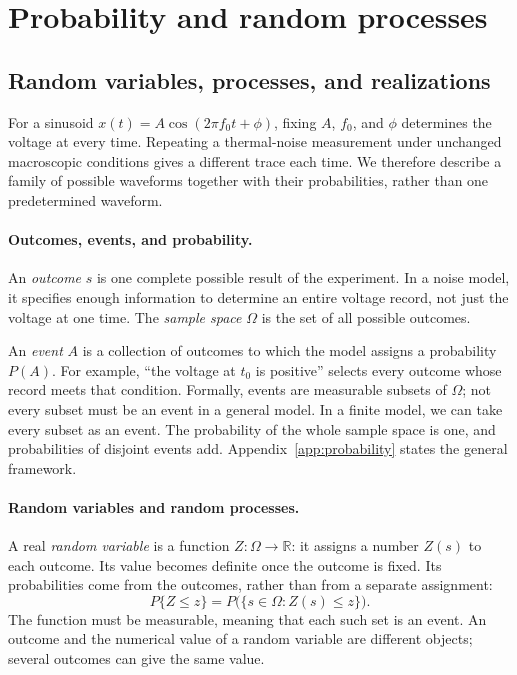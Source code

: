 
\section{Probability and random processes}
\subsection{Random variables, processes, and realizations}
For a sinusoid $x(t)=A\cos(2\pi f_0t+\phi)$, fixing $A$, $f_0$, and $\phi$ determines the voltage at every time. Repeating a thermal-noise measurement under unchanged macroscopic conditions gives a different trace each time. We therefore describe a family of possible waveforms together with their probabilities, rather than one predetermined waveform.

\paragraph{Outcomes, events, and probability.}
An \emph{outcome} $s$ is one complete possible result of the experiment. In a noise model, it specifies enough information to determine an entire voltage record, not just the voltage at one time. The \emph{sample space} $\Omega$ is the set of all possible outcomes.

An \emph{event} $A$ is a collection of outcomes to which the model assigns a probability $P(A)$. For example, ``the voltage at $t_0$ is positive'' selects every outcome whose record meets that condition. Formally, events are measurable subsets of $\Omega$; not every subset must be an event in a general model. In a finite model, we can take every subset as an event. The probability of the whole sample space is one, and probabilities of disjoint events add. Appendix~\ref{app:probability} states the general framework.

\paragraph{Random variables and random processes.}
A real \emph{random variable} is a function $Z:\Omega\to\mathbb R$: it assigns a number $Z(s)$ to each outcome. Its value becomes definite once the outcome is fixed. Its probabilities come from the outcomes, rather than from a separate assignment:
\[
P\{Z\leq z\}=P\bigl(\{s\in\Omega:Z(s)\leq z\}\bigr).
\]
The function must be measurable, meaning that each such set is an event. An outcome and the numerical value of a random variable are different objects; several outcomes can give the same value.

